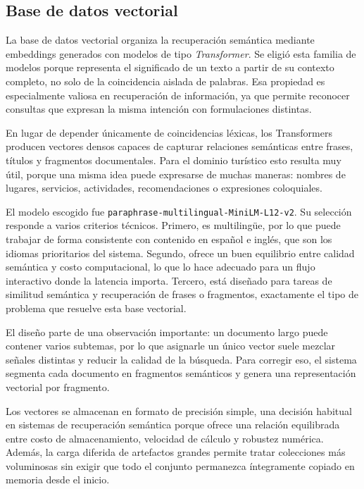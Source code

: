 \documentclass{llncs}
\begin{document}
\subsection{Base de datos vectorial}

La base de datos vectorial organiza la recuperación semántica mediante embeddings generados con modelos de tipo \textit{Transformer}. Se eligió esta familia de modelos porque representa el significado de un texto a partir de su contexto completo, no solo de la coincidencia aislada de palabras. Esa propiedad es especialmente valiosa en recuperación de información, ya que permite reconocer consultas que expresan la misma intención con formulaciones distintas.

En lugar de depender únicamente de coincidencias léxicas, los Transformers producen vectores densos capaces de capturar relaciones semánticas entre frases, títulos y fragmentos documentales. Para el dominio turístico esto resulta muy útil, porque una misma idea puede expresarse de muchas maneras: nombres de lugares, servicios, actividades, recomendaciones o expresiones coloquiales.

El modelo escogido fue \texttt{paraphrase-multilingual-MiniLM-L12-v2}. Su selección responde a varios criterios técnicos. Primero, es multilingüe, por lo que puede trabajar de forma consistente con contenido en español e inglés, que son los idiomas prioritarios del sistema. Segundo, ofrece un buen equilibrio entre calidad semántica y costo computacional, lo que lo hace adecuado para un flujo interactivo donde la latencia importa. Tercero, está diseñado para tareas de similitud semántica y recuperación de frases o fragmentos, exactamente el tipo de problema que resuelve esta base vectorial.

El diseño parte de una observación importante: un documento largo puede contener varios subtemas, por lo que asignarle un único vector suele mezclar señales distintas y reducir la calidad de la búsqueda. Para corregir eso, el sistema segmenta cada documento en fragmentos semánticos y genera una representación vectorial por fragmento.

Los vectores se almacenan en formato de precisión simple, una decisión habitual en sistemas de recuperación semántica porque ofrece una relación equilibrada entre costo de almacenamiento, velocidad de cálculo y robustez numérica. Además, la carga diferida de artefactos grandes permite tratar colecciones más voluminosas sin exigir que todo el conjunto permanezca íntegramente copiado en memoria desde el inicio.
\end{document}
